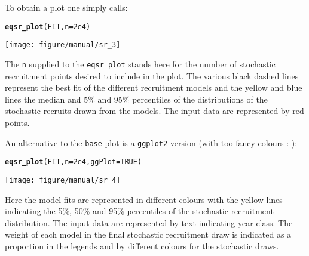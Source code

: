 \documentclass[a4paper]{article}\usepackage{graphicx, color}
\makeatletter
\def\maxwidth{ %
  \ifdim\Gin@nat@width>\linewidth
    \linewidth
  \else
    \Gin@nat@width
  \fi
}
\newcommand{\hlfunctioncall}[1]{\textcolor[rgb]{0.501960784313725,0,0.329411764705882}{\textbf{#1}}}%
\newenvironment{kframe}{%
 \def\at@end@of@kframe{}%
 \ifinner\ifhmode%
  \def\at@end@of@kframe{\end{minipage}}%
  \begin{minipage}{\columnwidth}%
 \fi\fi%
 \def\FrameCommand##1{\hskip\@totalleftmargin \hskip-\fboxsep
 \colorbox{shadecolor}{##1}\hskip-\fboxsep
     \hskip-\linewidth \hskip-\@totalleftmargin \hskip\columnwidth}%
 \MakeFramed {\advance\hsize-\width
   \@totalleftmargin\z@ \linewidth\hsize
   \@setminipage}}%
 {\par\unskip\endMakeFramed%
 \at@end@of@kframe}
\newenvironment{knitrout}{}{} %
\makeatother
\begin{document}
To obtain a plot one simply calls:
\begin{knitrout}
\color{fgcolor}\begin{kframe}
\begin{alltt}
\hlfunctioncall{eqsr_plot}(FIT,n=2e4)
\end{alltt}
\end{kframe}

{\centering \texttt{[image: figure/manual/sr\_3]} 

}



\end{knitrout}

The \texttt{n} supplied to the \texttt{eqsr\_plot} stands here for the number of stochastic recruitment points desired to include in the plot. The various black dashed lines represent the best fit of the different recruitment models and the yellow and blue lines the median and 5\% and 95\% percentiles of the distributions of the stochastic recruits drawn from the models. The input data are represented by red points.

An alternative to the \texttt{base} plot is a \texttt{ggplot2} version (with too fancy colours :-):
\begin{knitrout}
\color{fgcolor}\begin{kframe}
\begin{alltt}
\hlfunctioncall{eqsr_plot}(FIT,n=2e4,ggPlot=TRUE)
\end{alltt}
\end{kframe}

{\centering \texttt{[image: figure/manual/sr\_4]} 

}



\end{knitrout}

Here the model fits are represented in different colours with the yellow lines indicating the 5\%, 50\% and 95\% percentiles of the stochastic recruitment distribution. The input data are represented by text indicating year class. The weight of each model in the final stochastic recruitment draw is indicated as a proportion in the legends and by different colours for the stochastic draws.
\end{document}

